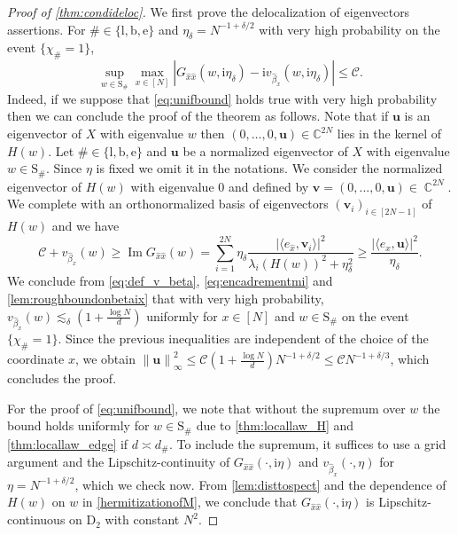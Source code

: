 \documentclass[11pt]{article}
\DeclareMathOperator{\Ima}{Im}
\DeclareMathOperator{\CC}{\mathbb{C}}
\newcommand{\ii}{\mathrm{i}}
\newcommand{\abs}[1]{\left| #1 \right|}
\newcommand{\norm}[1]{\left\| #1 \right\|}
\newcommand{\C}{\mathbb{C}}
\theoremstyle{plain}
\theoremstyle{remark}
\numberwithin{equation}{section}
\newcommand*\ubarr[1]{{\widehat{#1}}}
\begin{document}
		\begin{proof}[Proof of \cref{thm:condideloc}]
   
		We first prove the delocalization of eigenvectors assertions. For $\# \in \{\mathrm{l},\mathrm{b},\mathrm{e}\}$ and $\eta_{\delta}= N^{-1+ \delta/2}$ with very high probability on the event $\{\chi_{\#}=1\}$, 
		\begin{equation}\label{eq:unifbound}
			\sup_{w \in \mathrm{S}_{\#}} \max_{x \in [N]}\abs{G_{\ubarr{x}\ubarr{x}}(w, \ii \eta_\delta) - \ii v_{\ubarr{\beta}_{x}}(w, \ii \eta_{\delta})} \le \mathcal{C}.
		\end{equation}
	 Indeed, if we suppose that \cref{eq:unifbound} holds true with very high probability then we can conclude the proof of the theorem as follows. Note that if $\mathbf u$ is an eigenvector of $X$ with eigenvalue $w$ then $(0,\ldots, 0,\mathbf u) \in \C^{2N}$ lies in the kernel of $H(w)$. 
		Let $\# \in \{\mathrm{l},\mathrm{b},\mathrm{e}\}$ and $\mathbf{u}$ be a normalized eigenvector of $X$ with eigenvalue $w \in \mathrm{S}_{\#}$. Since $\eta $ is fixed we omit it in the notations. We consider the normalized eigenvector of $H(w)$ with eigenvalue $0$ and defined by $\mathbf{v} = (0,...,0, \mathbf{u}) \in \CC^{2N}$. We complete with an orthonormalized basis of eigenvectors $(\mathbf{v}_{i})_{i \in [2N-1]}$ of $H(w)$ and we have
		\begin{equation*}
			\mathcal{C} + v_{\ubarr{\beta}_x}(w)\ge \Ima G_{\ubarr{x}\ubarr{x}} (w)  = \sum_{i=1}^{2N} \eta_{\delta} \frac{\abs{\langle e_{\ubarr{x}},\mathbf{v}_i\rangle}^2}{\lambda_{i} (H(w))^2 + \eta_{\delta}^2} \ge \frac{\abs{\langle e_{x},\mathbf{u} \rangle}^2}{\eta_{\delta}}. 
		\end{equation*}
		 We conclude from \cref{eq:def_v_beta}, \cref{eq:encadrementmi} and \cref{lem:roughboundonbetaix}  that with very high probability,   $v_{\ubarr{\beta}_{x}}(w)  \lesssim_{\delta} \left( 1 + \frac{\log N}{d} \right)$ uniformly for $x\in [N]$ and $w \in \mathrm{S}_{\#}$ on the event $\{\chi_{\#}=1\}$. Since the previous inequalities are independent of the choice of the coordinate $x$, we obtain $\norm{\mathbf u}^2_\infty \le \mathcal C \left( 1 + \frac{\log N}{d} \right) N^{-1+ \delta/2} \le \mathcal C N^{-1+ \delta/3}$, which concludes the proof.  
		 
For the proof of \cref{eq:unifbound}, we note that without the supremum over $w$ the bound holds uniformly for $w \in \mathrm{S}_\#$ due to \cref{thm:locallaw_H} and \cref{thm:locallaw_edge} if $d \asymp d_\#$. To include the supremum, it suffices to use a grid argument and the Lipschitz-continuity of $G_{\ubarr{x}\ubarr{x}}(\cdot, \ii \eta)$ and $v_{\ubarr{\beta}_x}( \cdot, \eta)$ for $\eta = N^{-1 + \delta/2}$, which we check now. 
		From \cref{lem:disttospect} and the dependence of $H(w)$ on $w$ in \cref{hermitizationofM}, we conclude that 
		$G_{\ubarr{x}\ubarr{x}}(\cdot, \ii \eta)$ is Lipschitz-continuous on $\mathrm{D}_2$ with constant $N^2$. 
		

\end{proof}
\end{document}
